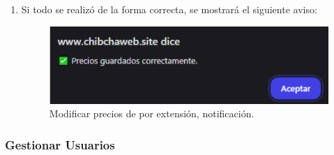 \begin{enumerate}
    \item  Si todo se realizó de la forma correcta, se mostrará el siguiente aviso:
    \begin{figure}[H]
        \centering
        \includegraphics[width=0.75\linewidth]{guiamodulo/mod-precios-aviso.png}
        \caption{Modificar precios de por extensión, notificación.}
        \label{fig:mod-precios-aviso}
    \end{figure}
\end{enumerate}


\subsubsection{Gestionar Usuarios}

